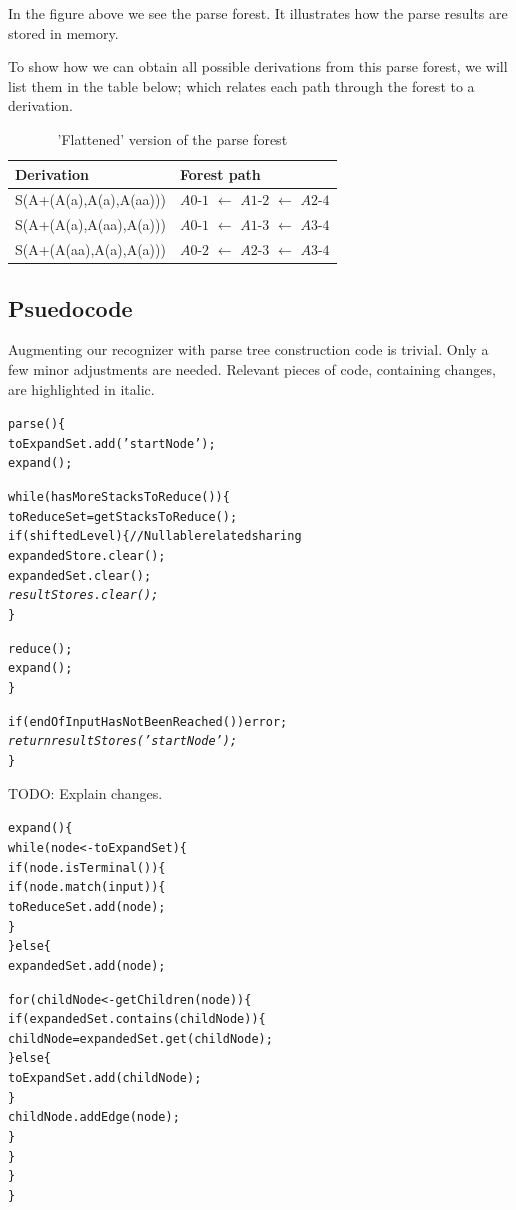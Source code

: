 \documentclass[a4paper,10pt]{article}
\begin{document}
In the figure above we see the parse forest. It illustrates how the parse results are stored in memory.

To show how we can obtain all possible derivations from this parse forest, we will list them in the table below; which relates each path through the forest to a derivation.

\begin{table}[H]
\centering
\begin{tabular}{ p{15em} p{15em} }
Derivation & Forest path\\
\hline
S(A+(A(a),A(a),A(aa))) & $A0$-$1$ $\leftarrow$ $A1$-$2$ $\leftarrow$ $A2$-$4$\\
S(A+(A(a),A(aa),A(a))) & $A0$-$1$ $\leftarrow$ $A1$-$3$ $\leftarrow$ $A3$-$4$\\
S(A+(A(aa),A(a),A(a))) & $A0$-$2$ $\leftarrow$ $A2$-$3$ $\leftarrow$ $A3$-$4$
\end{tabular}
\caption{'Flattened' version of the parse forest}
\end{table}

\subsection{Psuedocode}

Augmenting our recognizer with parse tree construction code is trivial. Only a few minor adjustments are needed. Relevant pieces of code, containing changes, are highlighted in italic.

{\small
\begin{alltt}
parse()\{
  toExpandSet.add('startNode');
  expand();
  
  while(hasMoreStacksToReduce())\{
    toReduceSet = getStacksToReduce();
    if(shiftedLevel)\{ // Nullable related sharing
      expandedStore.clear();
      expandedSet.clear();\textit{
      resultStores.clear();}
    \}
    
    reduce();
    expand();
  \}
  
  if(endOfInputHasNotBeenReached()) error;
  \textit{
  return resultStores('startNode');}
\}
\end{alltt}
}

TODO: Explain changes.

{\small
\begin{alltt}
expand()\{
  while(node <- toExpandSet)\{
    if(node.isTerminal())\{
      if(node.match(input))\{
        toReduceSet.add(node);
      \}
    \}else\{
      expandedSet.add(node);
      
      for(childNode <- getChildren(node))\{
        if(expandedSet.contains(childNode))\{
          childNode = expandedSet.get(childNode);
        \}else\{
          toExpandSet.add(childNode);
        \}
        childNode.addEdge(node);
      \}
    \}
  \}
\}
\end{alltt}
}
\end{document}
